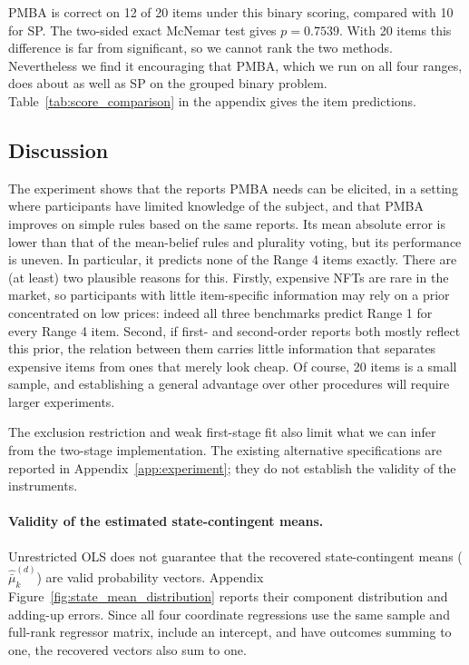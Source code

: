 \documentclass[12pt,reqno]{amsart}
\begin{document}
PMBA is correct on 12 of 20 items under this binary scoring, compared with 10 for SP. The two-sided exact McNemar test gives $p=0.7539$.  With 20 items this difference is far from significant, so we cannot rank the two methods. Nevertheless we find it encouraging that PMBA, which we run on all four ranges, does about as well as SP on the grouped binary problem. Table~\ref{tab:score_comparison} in the appendix gives the item predictions.

\subsection{Discussion}
  The experiment shows that the reports PMBA needs can be elicited, in a setting where participants have limited knowledge of the subject, and that PMBA improves on simple rules based on the same reports. Its mean absolute error is lower than that of the mean-belief rules and plurality voting, but its performance is uneven. In particular, it predicts none of the Range 4 items exactly. There are (at least) two plausible reasons for this. Firstly, expensive NFTs are rare in the market, so participants with little item-specific information may rely on a prior concentrated on low prices: indeed all three benchmarks predict Range 1 for every Range 4 item. Second, if first- and second-order reports both mostly reflect this prior, the relation between them carries little information that separates expensive items from ones that merely look cheap.  Of course, 20 items is a small sample, and establishing a general advantage over other procedures will require larger experiments.

The exclusion restriction and weak first-stage fit also limit what we can infer from the two-stage implementation. The existing alternative specifications are reported in Appendix~\ref{app:experiment}; they do not establish the validity of the instruments.

\paragraph{Validity of the estimated state-contingent means.}
Unrestricted OLS does not guarantee that the recovered state-contingent
means ($\hat{\bar\mu}_k^{(d)}$) are valid probability vectors. Appendix Figure~\ref{fig:state_mean_distribution} reports their component
distribution and adding-up errors. Since all four coordinate
regressions use the same sample and full-rank regressor matrix,
include an intercept, and have outcomes summing to one, the recovered
vectors also sum to one.
\end{document}
